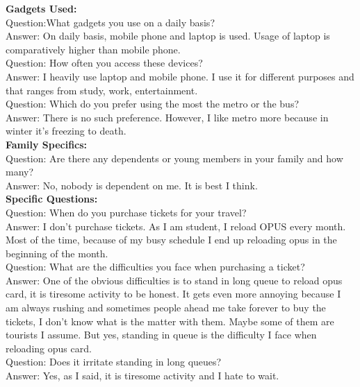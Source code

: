 \documentclass[11pt, english]{report}
\begin{document}
\textbf{Gadgets Used:}\\

Question:What gadgets you use on a daily basis?\\
Answer: On daily basis, mobile phone and laptop is used. Usage of laptop is comparatively higher than mobile phone.\\

Question: How often you access these devices?\\
Answer: I heavily use laptop and mobile phone. I use it for different purposes and that ranges from study, work, entertainment. \\

Question: Which do you prefer using the most the metro or the bus?\\
Answer: There is no such preference. However, I like metro more because in winter it's freezing to death.\\

\textbf{Family Specifics:}\\

Question: Are there any dependents or young members in your family and how many?\\
Answer: No, nobody is dependent on me. It is best I think. \\

\textbf{Specific Questions:}\\

Question: When do you purchase tickets for your travel?\\
Answer: I don't purchase tickets. As I am student, I reload OPUS every month. Most of the time, because of my busy schedule I end up reloading opus in the beginning of the month.\\

Question: What are the difficulties you face when purchasing a ticket?\\
Answer: One of the obvious difficulties is to stand in long queue to reload opus card, it is tiresome activity to be honest. It gets even more annoying because I am always rushing and sometimes people ahead me take forever to buy the tickets, I don't know what is the matter with them. Maybe some of them are tourists I assume. But yes, standing in queue is the difficulty I face when reloading opus card. \\

Question: Does it irritate standing in long queues?\\
Answer: Yes, as I said, it is tiresome activity and I hate to wait.\\
\end{document}

